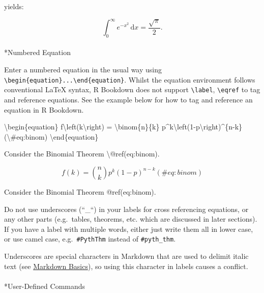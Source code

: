 \documentclass[
  letterpaper,
]{article}
\makeatletter
\let\oldparagraph\paragraph
\renewcommand{\paragraph}{
    \@ifstar
      \xxxParagraphStar
      \xxxParagraphNoStar
  }
\newcommand{\xxxParagraphStar}[1]{\oldparagraph*{#1}\mbox{}}
\newcommand{\xxxParagraphNoStar}[1]{\oldparagraph{#1}\mbox{}}
\newenvironment{Shaded}{\begin{snugshade}}{\end{snugshade}}
\newcommand{\NormalTok}[1]{\textcolor[rgb]{0.00,0.23,0.31}{#1}}
\newcommand{\SpecialCharTok}[1]{\textcolor[rgb]{0.37,0.37,0.37}{#1}}
\numberwithin{equation}{section}
\numberwithin{figure}{section}
\theoremstyle{break}
\makeatother
\begin{document}
yields:

\[
 \int_0^\infty e^{-x^2}\,\mathrm{d}x = \frac{\sqrt{\pi}}{2}. 
\]

\paragraph*{Numbered Equation}\label{numbered-equation}

Enter a numbered equation in the usual way using
\texttt{\textbackslash{}begin\{equation\}...\textbackslash{}end\{equation\}}.
Whilst the equation environment follows conventional LaTeX syntax, R
Bookdown does not support \texttt{\textbackslash{}label},
\texttt{\textbackslash{}eqref} to tag and reference equations. See the
example below for how to tag and reference an equation in R Bookdown.

\label{EqRef}
\begin{Shaded}
\begin{Highlighting}[]
\NormalTok{\textbackslash{}begin\{equation\} }
\NormalTok{  f\textbackslash{}left(k\textbackslash{}right) = \textbackslash{}binom\{n\}\{k\} p\^{}k\textbackslash{}left(1{-}p\textbackslash{}right)\^{}\{n{-}k\}}
\NormalTok{  (}\SpecialCharTok{\textbackslash{}\#}\NormalTok{eq:binom)}
\NormalTok{\textbackslash{}end\{equation\} }
    
\NormalTok{Consider the Binomial Theorem \textbackslash{}@ref(eq:binom).}
\end{Highlighting}
\end{Shaded}

\begin{equation} 
  f\left(k\right) = \binom{n}{k} p^k\left(1-p\right)^{n-k}
  (\#eq:binom)
\end{equation}

Consider the Binomial Theorem @ref(eq:binom).

Do not use underscores (``\_``) in your labels for cross referencing
equations, or any other parts (e.g.~tables, theorems, etc. which are
discussed in later sections). If you have a label with multiple words,
either just write them all in lower case, or use camel case,
e.g.~\texttt{\#PythThm} instead of \texttt{\#pyth\_thm}.

Underscores are special characters in Markdown that are used to delimit
italic text (see \hyperref[markdown-basics]{Markdown Basics}), so using
this character in labels causes a conflict.

\paragraph*{User-Defined Commands}\label{user-defined-commands}
\end{document}
